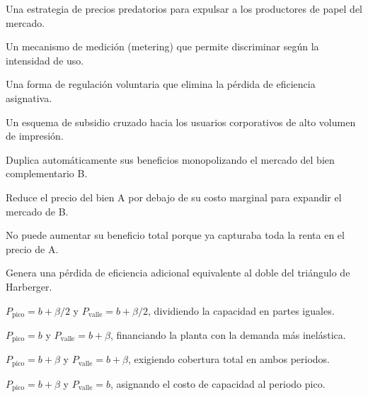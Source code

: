 \begin{opts}
    \item Una estrategia de precios predatorios para expulsar a los productores de papel del mercado.
    \item Un mecanismo de medición (metering) que permite discriminar según la intensidad de uso.
    \item Una forma de regulación voluntaria que elimina la pérdida de eficiencia asignativa.
    \item Un esquema de subsidio cruzado hacia los usuarios corporativos de alto volumen de impresión.
\end{opts}

\begin{opts}
    \item Duplica automáticamente sus beneficios monopolizando el mercado del bien complementario B.
    \item Reduce el precio del bien A por debajo de su costo marginal para expandir el mercado de B.
    \item No puede aumentar su beneficio total porque ya capturaba toda la renta en el precio de A.
    \item Genera una pérdida de eficiencia adicional equivalente al doble del triángulo de Harberger.
\end{opts}

\begin{opts}
    \item $P_{\text{pico}} = b + \beta/2$ y $P_{\text{valle}} = b + \beta/2$, dividiendo la capacidad en partes iguales.
    \item $P_{\text{pico}} = b$ y $P_{\text{valle}} = b + \beta$, financiando la planta con la demanda más inelástica.
    \item $P_{\text{pico}} = b + \beta$ y $P_{\text{valle}} = b + \beta$, exigiendo cobertura total en ambos periodos.
    \item $P_{\text{pico}} = b + \beta$ y $P_{\text{valle}} = b$, asignando el costo de capacidad al periodo pico.
\end{opts}

